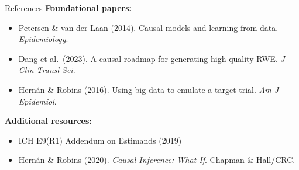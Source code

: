 \documentclass[aspectratio=169]{beamer}
\begin{document}
\begin{frame}{References}
  \footnotesize
  \textbf{Foundational papers:}
  \begin{itemize}
    \item Petersen \& van der Laan (2014). Causal models and learning from data. \textit{Epidemiology}.
    \item Dang et al.\ (2023). A causal roadmap for generating high-quality RWE. \textit{J Clin Transl Sci}.
    \item Hern{\'a}n \& Robins (2016). Using big data to emulate a target trial. \textit{Am J Epidemiol}.
  \end{itemize}
  \vspace{0.3em}

  \textbf{Additional resources:}
  \begin{itemize}
    \item ICH E9(R1) Addendum on Estimands (2019)
    \item Hern{\'a}n \& Robins (2020). \textit{Causal Inference: What If}. Chapman \& Hall/CRC.
  \end{itemize}
\end{frame}
\end{document}
